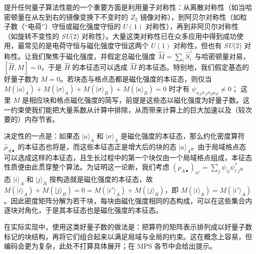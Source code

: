 \documentclass[a4paper,10pt,oneside,onecolumn,1p,times]{elsarticle}
\newcommand{\ket}[1]{\mbox{$| #1  \rangle$}}
\begin{document}
提升任何量子算法性能的一个重要方面是利用量子对称性：从离散对称性（如当哈密顿量在从左到右的镜像变换下不变时的 $Z_2$ 镜像对称），到阿贝尔对称性（如粒子数（``电荷''）守恒或磁化强度守恒的 $U(1)$ 对称性），再到非阿贝尔对称性（如旋转不变性的 {\em SU}(2) 对称性）\cite{McCulloch07,SierraNishino97,McCulloch00,McCulloch01,McCulloch02}。大量这类对称性已在众多应用中得到成功使用，最常见的是电荷守恒与磁化强度守恒这两个 $U(1)$ 对称性，但也有 {\em SU}(2) 对称性\cite{McCulloch08a,Smerat09,Langer09,Holzner09}。让我们聚焦于磁化强度，并假定总磁化强度 $\hat{M} = \sum_i \hat{S}^z_i$ 与哈密顿量对易，$[\hat{H},\hat{M}]=0$，于是 $\hat{H}$ 的本征态可以选成 $\hat{M}$ 的本征态。特别地，我们假定基态的好量子数为 $M=0$。若块态与格点态都是磁化强度的本征态，则仅当 $M (\ket{a}_A) +  M (\ket{\sigma}_A) + M (\ket{\sigma}_B) + M (\ket{a}_B) = 0$ 时才有 $\psi_{a_A \sigma_A \sigma_B a_B} \neq 0$；
这里 $M$ 是相应块和格点磁化强度的简写，前提是这些态以磁化强度为好量子数。这一约束使我们能把大量系数从计算中排除，从而带来计算上的巨大加速以及（较次要的）内存节省。

决定性的一点是：如果态 $\ket{a}_A$ 和 $\ket{\sigma}_A$ 是磁化强度的本征态，那么约化密度算符 $\hat{\rho}_{A\bullet}$ 的本征态也将是，而这些本征态正是增大后的块的态 $\ket{a}_A$。由于局域格点态可以选成这样的本征态，且生长过程中的第一个块仅由一个局域格点组成，本征态性质便由此贯穿整个算法。为证明这一论断，我们考虑 $(\rho_{A\bullet})_{ii'} = \sum_j \psi_{ij} \psi^*_{i'j}$。态 $\ket{i}_A$ 和 $\ket{j}_B$ 按构造就是磁化强度的本征态，故
$M (\ket{i}_A) + M(\ket{j}_B) = 0 = M (\ket{i'}_A) + M (\ket{j}_B)$，即 $M (\ket{i}_A) = M (\ket{i'}_A)$。因此密度矩阵分解为若干块，每块由磁化强度相同的态构成，可以在这些集合内逐块对角化，于是其本征态也是磁化强度的本征态。

在实际实现中，使用这类好量子数的做法是：把算符的矩阵表示排列成以好量子数标记的块结构，再将它们组合起来以满足局域与全局的约束。这在概念上容易，但编码会更为复杂，此处不打算具体展开；在 MPS 各节中会给出提示。
\end{document}
